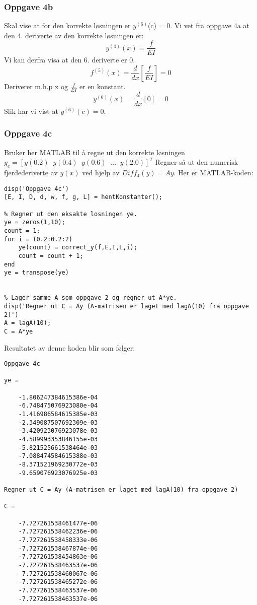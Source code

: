 \subsubsection{Oppgave 4b}
Skal vise at for den korrekte løsningen er $y^{(6)}$(c) = 0. Vi vet fra oppgave 4a at den 4. deriverte av den korrekte løsningen er:
\begin{equation*}
y^{(4)}(x) = \frac{f}{EI}
\end{equation*}
Vi kan derfra visa at den 6. deriverte er 0.
\begin{equation}
f^{(5)}(x) = \frac{d}{dx}[\frac{f}{EI}] = 0
\end{equation}
Deriverer m.h.p x og $\frac{f}{EI}$ er en konstant.
\begin{equation}
y^{(6)}(x) = \frac{d}{dx}[0] = 0
\end{equation}
Slik har vi vist at $y^{(6)}(c) = 0$.

\subsubsection{Oppgave 4c}
Bruker her MATLAB til å regne ut den korrekte løsningen $y_e = [y(0.2)\;\;y(0.4)\;\;y(0.6)\;\;...\;\;y(2.0)]^T$ Regner så ut den numerisk fjerdederiverte av $y(x)$ ved hjelp av $Diff_4(y)= Ay$. Her er MATLAB-koden:
\begin{lstlisting}
disp('Oppgave 4c')
[E, I, D, d, w, f, g, L] = hentKonstanter();

% Regner ut den eksakte losningen ye.
ye = zeros(1,10);
count = 1;
for i = (0.2:0.2:2)
    ye(count) = correct_y(f,E,I,L,i);
    count = count + 1;
end
ye = transpose(ye)


% Lager samme A som oppgave 2 og regner ut A*ye.
disp('Regner ut C = Ay (A-matrisen er laget med lagA(10) fra oppgave 2)')
A = lagA(10);
C = A*ye
\end{lstlisting}
Resultatet av denne koden blir som følger:
\begin{lstlisting}
Oppgave 4c

ye =

    -1.806247384615386e-04
    -6.748475076923080e-04
    -1.416986584615385e-03
    -2.349087507692309e-03
    -3.420923076923078e-03
    -4.589993353846155e-03
    -5.821525661538464e-03
    -7.088474584615388e-03
    -8.371521969230772e-03
    -9.659076923076925e-03

Regner ut C = Ay (A-matrisen er laget med lagA(10) fra oppgave 2)

C =

    -7.727261538461477e-06
    -7.727261538462236e-06
    -7.727261538458333e-06
    -7.727261538467874e-06
    -7.727261538454863e-06
    -7.727261538463537e-06
    -7.727261538460067e-06
    -7.727261538465272e-06
    -7.727261538463537e-06
    -7.727261538463537e-06
\end{lstlisting}

